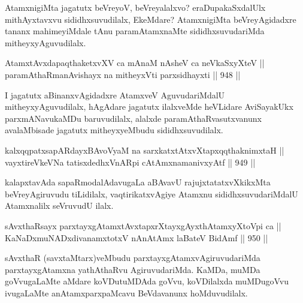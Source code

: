\begin{artha}
AtamxnigiMta jagatutx beVreyoV, beVreyalalxvo? eraDupakaSxdalUlx mithAyxtavxvu sididhxsuvudilalx, EkeMdare? AtamxnigiMta beVreyAgidadxre tananx mahimeyiMdale tAnu paramAtamxnaMte sididhxsuvudariMda mitheyxyAguvudilalx.
\end{artha}


\begin{shl}
AtamxtAvxdapaqthaketxvXV ca mAnaM nAsheV ca neVkaSxyXteV || \\
paramAthaRmanAvishayx na mitheyxVti parxsidhayxti \hfill || 948 ||  
\end{shl}

\begin{artha}
I jagatutx aBinanxvAgidadxre AtamxveV AguvudariMdalU mitheyxyAguvudilalx, hAgAdare jagatutx ilalxveMde heVLidare AviSayakUkx parxmANavukaMDu baruvudilalx, alalxde paramAthaRvasutxvanunx avalaMbisade jagatutx mitheyxyeMbudu sididhxsuvudilalx.
\end{artha}


\begin{shl}
kalxqqpatxsapARdayxBAvoV\s yaM na sarxkatxtAtxvXtapxqqthaknimxtaH || \\
vayxtireVkeVNa tatisxdedhxVnARpi cA\s \s tAmxnamanivxyAtf \hfill || 949 ||  
\end{shl}

\begin{artha}
kalapxtavAda sapaRmodalAdavugaLa aBAvavU rajujxtatatxvXkikxMta beVreyAgiruvudu tiLidilalx, vaqtirikatxvAgiye Atamxnu sididhxsuvudariMdalU Atamxnalilx seVruvudU ilalx.
\end{artha}


\begin{shl}
sAvxthaRsayx parxtayxgAtamxtAvxtapxrXtayxgAyxthAtamxyXtoV\s pi ca || \\
KaNaDxmuNADxdivanamxtotxV nAnAtAmx laBateV BidAmf \hfill || 950 ||  
\end{shl}

\begin{artha}
sAvxthaR (savxtaMtarx)veMbudu parxtayxgAtamxvAgiruvudariMda parxtayxgAtamxna yathAthaRvu AgiruvudariMda. KaMDa, muMDa goVvugaLaMte aMdare koVDutuMDAda goVvu, koVDilalxda muMDugoVvu ivugaLaMte anAtamxparxpaMcavu BeVdavanunx hoMduvudilalx.
\end{artha}

